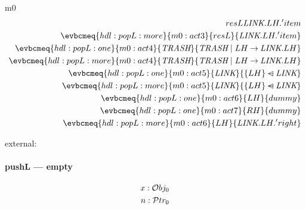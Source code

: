 \documentclass[12pt]{amsart}
\newcommand{\OBJ}{\mathcal{O}bj}
\newcommand{\Addr}{\mathcal{P}tr}
\newcommand{\link}{\textit{LINK}}
\newcommand{\trash}{\textit{TRASH}}
\begin{document}
\begin{machine}{m0}
\begin{align*}
    {resL}{\link.LH.'item} \\
  \evbcmeq{hdl:popL:more}{m0:act3}
    {resL}{\link.LH.'item} \\
  \evbcmeq{hdl:popL:one}{m0:act4}
    {\trash}{\trash \1| LH \fun \link.LH} \\
  \evbcmeq{hdl:popL:more}{m0:act4}
    {\trash}{\trash \1| LH \fun \link.LH} \\
  \evbcmeq{hdl:popL:one}{m0:act5}
    {\link}{ \{LH\} \domsub \link } \\
  \evbcmeq{hdl:popL:more}{m0:act5}
    {\link}{ \{LH\} \domsub \link } \\
  \evbcmeq{hdl:popL:one}{m0:act6}
    {LH}{ dummy } \\
  \evbcmeq{hdl:popL:one}{m0:act7}
    {RH}{ dummy } \\
  \evbcmeq{hdl:popL:more}{m0:act6}
    {LH}{ \link.LH.'right } \\
\end{align*}

external:

\paragraph{pushL --- empty}

\begin{align*}
  \param{ext:pushL:empty}{x : \OBJ_0 } \\
  \param{ext:pushL:empty}{n : \Addr_0 } \\
\end{align*}


\end{machine}
\end{document}
